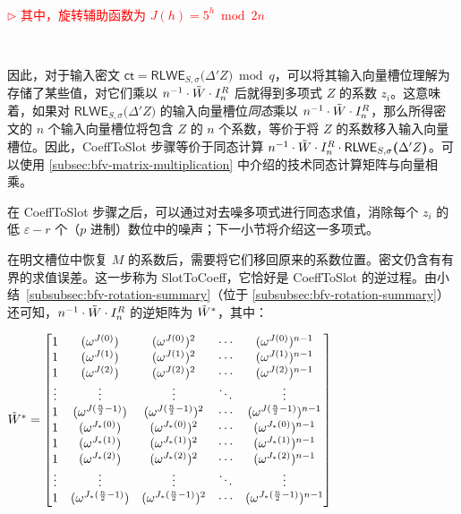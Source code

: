 $ $

\textcolor{red}{ $\rhd$ 其中，旋转辅助函数为 $J(h) = 5^h \bmod 2n$}

$ $

因此，对于输入密文 $\textsf{ct} = \textsf{RLWE}_{S, \sigma}\bm(\Delta' Z\bm) \bmod q$，可以将其输入向量槽位理解为存储了某些值，对它们乘以 $n^{-1}\cdot\tilde{W} \cdot I_n^R$ 后就得到多项式 $Z$ 的系数 $z_i$。这意味着，如果对 $\textsf{RLWE}_{S, \sigma}\bm(\Delta' Z\bm)$ 的输入向量槽位\textit{同态}乘以 $n^{-1}\cdot\tilde{W} \cdot I_n^R$，那么所得密文的 $n$ 个输入向量槽位将包含 $Z$ 的 $n$ 个系数，等价于将 $Z$ 的系数移入输入向量槽位。因此，\textsf{CoeffToSlot} 步骤等价于同态计算 $n^{-1}\cdot\tilde{W} \cdot I_n^R \cdot \textsf{RLWE}_{S, \sigma}\bm(\Delta' Z\bm)$。可以使用 \autoref{subsec:bfv-matrix-multiplication} 中介绍的技术同态计算矩阵与向量相乘。

在 \textsf{CoeffToSlot} 步骤之后，可以通过对去噪多项式进行同态求值，消除每个 $z_i$ 的低 $\varepsilon-r$ 个（$p$ 进制）数位中的噪声；下一小节将介绍这一多项式。

在明文槽位中恢复 $M$ 的系数后，需要将它们移回原来的系数位置。密文仍含有有界的求值误差。这一步称为 \textsf{SlotToCoeff}，它恰好是 \textsf{CoeffToSlot} 的逆过程。由小结~\ref*{subsubsec:bfv-rotation-summary}（位于 \autoref{subsubsec:bfv-rotation-summary}）还可知，$n^{-1}\cdot\tilde{W} \cdot I_n^R$ 的逆矩阵为 $\tilde{W}^*$，其中：

$\tilde{W}^* = \begin{bmatrix}
1 & (\omega^{J(0)}) & (\omega^{J(0)})^2 & \cdots & (\omega^{J(0)})^{n-1}\\
1 & (\omega^{J(1)}) & (\omega^{J(1)})^2 & \cdots & (\omega^{J(1)})^{n-1}\\
1 & (\omega^{J(2)}) & (\omega^{J(2)})^2 & \cdots & (\omega^{J(2)})^{n-1}\\
\vdots & \vdots & \vdots & \ddots & \vdots \\
1 & (\omega^{J(\frac{n}{2}-1)}) & (\omega^{J(\frac{n}{2}-1)})^2 & \cdots & (\omega^{J(\frac{n}{2}-1)})^{n-1}\\
1 & (\omega^{J_*(0)}) & (\omega^{J_*(0)})^2 & \cdots & (\omega^{J_*(0)})^{n-1}\\
1 & (\omega^{J_*(1)}) & (\omega^{J_*(1)})^2 & \cdots & (\omega^{J_*(1)})^{n-1}\\
1 & (\omega^{J_*(2)}) & (\omega^{J_*(2)})^2 & \cdots & (\omega^{J_*(2)})^{n-1}\\
\vdots & \vdots & \vdots & \ddots & \vdots \\
1 & (\omega^{J_*(\frac{n}{2}-1)}) & (\omega^{J_*(\frac{n}{2}-1)})^2 & \cdots & (\omega^{J_*(\frac{n}{2}-1)})^{n-1}\\
\end{bmatrix}$

